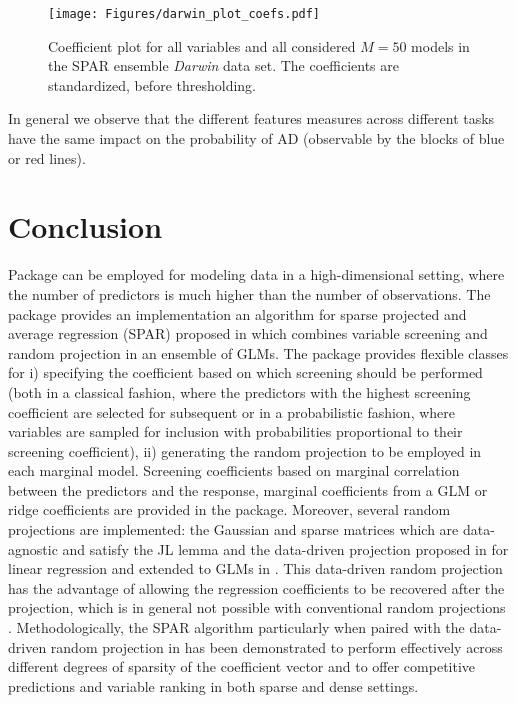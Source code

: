 \documentclass[
  article]{jss}
\begin{document}
\begin{figure}[t!]
\centering
\texttt{[image: Figures/darwin\_plot\_coefs.pdf]}
\caption{Coefficient plot for all variables and all considered $M=50$ models in the SPAR ensemble
\emph{Darwin} data set. The coefficients are standardized, before thresholding. \label{fig:darwin_coefs}}
\end{figure}

In general we observe that the different features measures across
different tasks have the same impact on the probability of AD
(observable by the blocks of blue or red lines).

\section{Conclusion}\label{sec-conclusion}

Package  can be employed for modeling data in a
high-dimensional setting, where the number of predictors is much higher
than the number of observations. The package provides an implementation
an algorithm for sparse projected and average regression (SPAR) proposed
in \citet{parzer2024glms} which combines variable screening and random
projection in an ensemble of GLMs. The package provides flexible classes
for i) specifying the coefficient based on which screening should be
performed (both in a classical fashion, where the predictors with the
highest screening coefficient are selected for subsequent or in a
probabilistic fashion, where variables are sampled for inclusion with
probabilities proportional to their screening coefficient), ii)
generating the random projection to be employed in each marginal model.
Screening coefficients based on marginal correlation between the
predictors and the response, marginal coefficients from a GLM or ridge
coefficients are provided in the package. Moreover, several random
projections are implemented: the Gaussian and sparse matrices which are
data-agnostic and satisfy the JL lemma and the data-driven projection
proposed in \citet{parzer2024sparse} for linear regression and extended
to GLMs in \citet{parzer2024glms}. This data-driven random projection
has the advantage of allowing the regression coefficients to be
recovered after the projection, which is in general not possible with
conventional random projections \citep{Thanei2017RPforHDR}.
Methodologically, the SPAR algorithm particularly when paired with the
data-driven random projection in \citet{parzer2024glms} has been
demonstrated to perform effectively across different degrees of sparsity
of the coefficient vector and to offer competitive predictions and
variable ranking in both sparse and dense settings.
\end{document}
